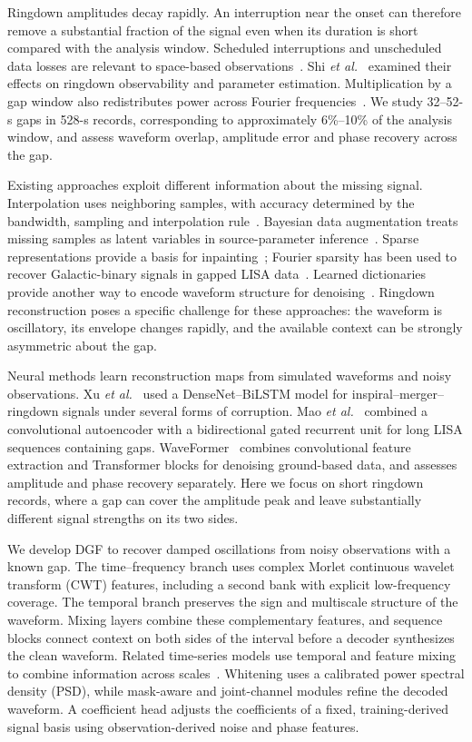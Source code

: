 \documentclass[10pt,prd,aps,a4paper,twocolumn,superscriptaddress,nofootinbib,floatfix]{revtex4-2}
\begin{document}
Ringdown amplitudes decay rapidly. An interruption near the onset can therefore remove a substantial fraction of the signal even when its duration is short compared with the analysis window. Scheduled interruptions and unscheduled data losses are relevant to space-based observations~\cite{Baghi2019,dey2021gaps}. Shi \textit{et al.}~\cite{shi2024effectsdatagapsringdown} examined their effects on ringdown observability and parameter estimation. Multiplication by a gap window also redistributes power across Fourier frequencies~\cite{Harris1978}. We study 32--52-s gaps in 528-s records, corresponding to approximately 6\%--10\% of the analysis window, and assess waveform overlap, amplitude error and phase recovery across the gap.

Existing approaches exploit different information about the missing signal. Interpolation uses neighboring samples, with accuracy determined by the bandwidth, sampling and interpolation rule~\cite{Horowitz1974,Maeland1988,Unser1999}. Bayesian data augmentation treats missing samples as latent variables in source-parameter inference~\cite{Baghi2019}. Sparse representations provide a basis for inpainting~\cite{Starck2010}; Fourier sparsity has been used to recover Galactic-binary signals in gapped LISA data~\cite{Blelly2021}. Learned dictionaries provide another way to encode waveform structure for denoising~\cite{TorresForne2016}. Ringdown reconstruction poses a specific challenge for these approaches: the waveform is oscillatory, its envelope changes rapidly, and the available context can be strongly asymmetric about the gap.

Neural methods learn reconstruction maps from simulated waveforms and noisy observations. Xu \textit{et al.}~\cite{Xu_2024} used a DenseNet--BiLSTM model for inspiral--merger--ringdown signals under several forms of corruption. Mao \textit{et al.}~\cite{Mao:2025cae} combined a convolutional autoencoder with a bidirectional gated recurrent unit for long LISA sequences containing gaps. WaveFormer~\cite{Wang:2024waveformer} combines convolutional feature extraction and Transformer blocks for denoising ground-based data, and assesses amplitude and phase recovery separately. Here we focus on short ringdown records, where a gap can cover the amplitude peak and leave substantially different signal strengths on its two sides.

We develop DGF to recover damped oscillations from noisy observations with a known gap. The time--frequency branch uses complex Morlet continuous wavelet transform (CWT) features, including a second bank with explicit low-frequency coverage. The temporal branch preserves the sign and multiscale structure of the waveform. Mixing layers combine these complementary features, and sequence blocks connect context on both sides of the interval before a decoder synthesizes the clean waveform. Related time-series models use temporal and feature mixing to combine information across scales~\cite{TSMixer2023,TimeMixer2024}. Whitening uses a calibrated power spectral density (PSD), while mask-aware and joint-channel modules refine the decoded waveform. A coefficient head adjusts the coefficients of a fixed, training-derived signal basis using observation-derived noise and phase features.
\end{document}
